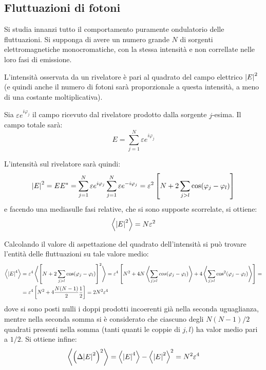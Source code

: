 \subsection{Fluttuazioni di fotoni}
\label{sec:fotonfluct}

Si studia innanzi tutto il comportamento puramente ondulatorio delle fluttuazioni. Si supponga di avere un numero grande $ N $ di sorgenti elettromagnetiche monocromatiche, con la stessa intensità e non correllate nelle loro fasi di emissione.

L'intensità osservata da un rivelatore è pari al quadrato del campo elettrico $ \abs{E}^2 $ (e quindi anche il numero di fotoni sarà proporzionale a questa intensità, a meno di una costante moltiplicativa).
\newline

Sia $ \varepsilon e^{i\varphi_j} $ il campo ricevuto dal rivelatore prodotto dalla sorgente $ j $-esima. Il campo totale sarà:
\[ E = \sum_{j = 1}^{N} \varepsilon e^{i\varphi_j} \]

L'intensità sul rivelatore sarà quindi:
\[  \abs{E}^2 = E E^\ast =  \sum_{j = 1}^{N} \varepsilon e^{i\varphi_j} \sum_{j = 1}^{N} \varepsilon e^{-i\varphi_j} = \varepsilon^2 \left[ N + 2 \sum_{j > l} \cos(\varphi_j - \varphi_l)\right] \]
e facendo una media\footnotemark sulle fasi relative, che si sono supposte scorrelate, si ottiene:
\[ \expval{\abs{E}^2} = N \varepsilon^2 \]

Calcolando il valore di aspettazione del quadrato dell'intensità si può trovare l'entità delle fluttuazioni su tale valore medio:
\begin{align*}
\expval{\abs{E}^4} &= \varepsilon^4 \expval{\left[ N +  2 \sum_{j > l} \cos(\varphi_j - \varphi_l) \right]^2} = \varepsilon^4 \left[ N^2 + 4 N \expval{\sum_{j > l} cos(\varphi_j - \varphi_l)} + 4 \expval{ \sum_{j > l} \cos^2(\varphi_j - \varphi_l)} \right] =\\
&= \varepsilon^4 \left[N^2 + 4 \frac{N(N - 1)}{2} \frac{1}{2}\right] = 2 N^2 \varepsilon^4
\end{align*}
dove si sono posti nulli i doppi prodotti incoerenti già nella seconda uguaglianza, mentre nella seconda somma si è considerato che ciascuno degli $ N(N-1)/2 $ quadrati presenti nella somma (tanti quanti le coppie di $ j,l $) ha valor medio pari a $ 1/2 $. Si ottiene infine:
\[ \expval{\left(\Delta\abs{E}^2\right)^2} = \expval{\abs{E}^4} - \expval{\abs{E}^2}^2 = N^2 \varepsilon^4\]

